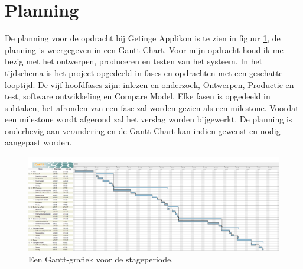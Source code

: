 \section{Planning}
De planning voor de opdracht bij Getinge Applikon is te zien in figuur \ref{fig:planning}, de planning is weergegeven in een Gantt Chart. Voor mijn opdracht houd ik me bezig met het ontwerpen, produceren en testen van het systeem. In het tijdschema is het project opgedeeld in fases en opdrachten met een geschatte
looptijd. De vijf hoofdfases zijn: inlezen en onderzoek, Ontwerpen, Productie en test, software ontwikkeling en Compare Model. Elke fasen is opgedeeld in subtaken, het afronden van een fase zal worden gezien als een milestone. Voordat een milestone wordt afgerond zal het verslag worden bijgewerkt. De planning is onderhevig aan verandering en de Gantt Chart kan indien gewenst en nodig aangepast worden.

\begin{figure}[H]
	\centering
	\includegraphics[width=1.0\linewidth]{graphics/planning_appl}
	\caption{Een Gantt-grafiek voor de stageperiode.}
	\label{fig:planning}
\end{figure}


